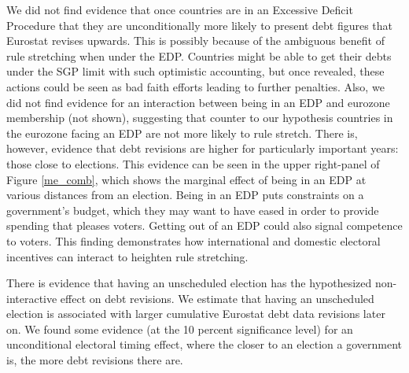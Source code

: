 \documentclass[]{article}
\begin{document}
\begin{landscape}
    
\end{landscape}

We did not find evidence that once countries are in an Excessive Deficit Procedure that they are unconditionally more likely to present debt figures that Eurostat revises upwards. This is possibly because of the ambiguous benefit of rule stretching when under the EDP. Countries might be able to get their debts under the SGP limit with such optimistic accounting, but once revealed, these actions could be seen as bad faith efforts leading to further penalties. Also, we did not find evidence for an interaction between being in an EDP and eurozone membership (not shown), suggesting that counter to our hypothesis countries in the eurozone facing an EDP are not more likely to rule stretch. There is, however, evidence that debt revisions are higher for particularly important years: those close to elections. This evidence can be seen in the upper right-panel of Figure \ref{me_comb}, which shows the marginal effect of being in an EDP at various distances from an election. Being in an EDP puts constraints on a government's budget, which they may want to have eased in order to provide spending that pleases voters. Getting out of an EDP could also signal competence to voters. This finding demonstrates how international and domestic electoral incentives can interact to heighten rule stretching.

There is evidence that having an unscheduled election has the hypothesized non-interactive effect on debt revisions. We estimate that having an unscheduled election is associated with larger cumulative Eurostat debt data revisions later on. We found some evidence (at the 10 percent significance level) for an unconditional electoral timing effect, where the closer to an election a government is, the more debt revisions there are.
\end{document}
